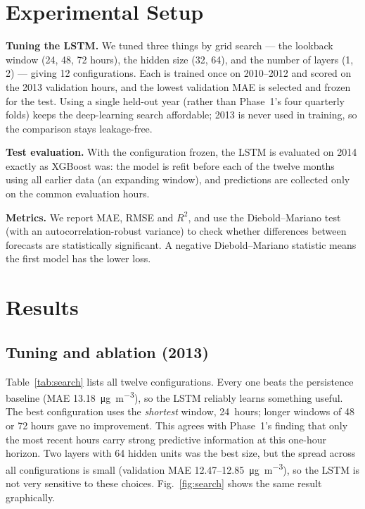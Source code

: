 \documentclass[onecolumn,11pt,journal]{IEEEtran}
\newcommand{\ugm}{\si{\micro\gram\per\cubic\metre}}
\begin{document}
\section{Experimental Setup}
\textbf{Tuning the LSTM.} We tuned three things by grid search --- the lookback window (24, 48, 72 hours), the hidden size (32, 64), and the number of layers (1, 2) --- giving 12 configurations. Each is trained once on 2010--2012 and scored on the 2013 validation hours, and the lowest validation MAE is selected and frozen for the test. Using a single held-out year (rather than Phase~1's four quarterly folds) keeps the deep-learning search affordable; 2013 is never used in training, so the comparison stays leakage-free.

\textbf{Test evaluation.} With the configuration frozen, the LSTM is evaluated on 2014 exactly as XGBoost was: the model is refit before each of the twelve months using all earlier data (an expanding window), and predictions are collected only on the common evaluation hours.

\textbf{Metrics.} We report MAE, RMSE and $R^2$, and use the Diebold--Mariano test (with an autocorrelation-robust variance) to check whether differences between forecasts are statistically significant. A negative Diebold--Mariano statistic means the first model has the lower loss.

\section{Results}
\subsection{Tuning and ablation (2013)}
Table~\ref{tab:search} lists all twelve configurations. Every one beats the persistence baseline (MAE 13.18~\ugm{}), so the LSTM reliably learns something useful. The best configuration uses the \emph{shortest} window, 24~hours; longer windows of 48 or 72 hours gave no improvement. This agrees with Phase~1's finding that only the most recent hours carry strong predictive information at this one-hour horizon. Two layers with 64 hidden units was the best size, but the spread across all configurations is small (validation MAE 12.47--12.85~\ugm{}), so the LSTM is not very sensitive to these choices. Fig.~\ref{fig:search} shows the same result graphically.
\end{document}
